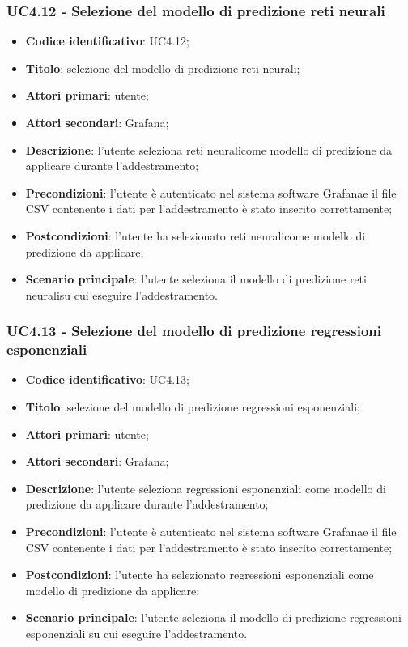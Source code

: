 \subsubsection{UC4.12 - Selezione del modello di predizione reti neurali}
\begin{itemize}
	\item \textbf{Codice identificativo}: UC4.12;
	\item \textbf{Titolo}: selezione del modello di predizione reti neurali\glo;
	\item \textbf{Attori primari}: utente;
	\item \textbf{Attori secondari}: Grafana\glo;
	\item \textbf{Descrizione}: l'utente seleziona reti neurali\glosp come modello di predizione da applicare durante l'addestramento;
	\item \textbf{Precondizioni}: l'utente è autenticato nel sistema software Grafana\glosp e il file CSV contenente i dati per l'addestramento è stato inserito correttamente;
	\item \textbf{Postcondizioni}: l'utente ha selezionato reti neurali\glosp come modello di predizione da applicare;
	\item \textbf{Scenario principale}: l'utente seleziona il modello di predizione reti neurali\glosp su cui eseguire l'addestramento.
\end{itemize}
\subsubsection{UC4.13 - Selezione del modello di predizione regressioni esponenziali}
\begin{itemize}
	\item \textbf{Codice identificativo}: UC4.13;
	\item \textbf{Titolo}: selezione del modello di predizione regressioni esponenziali;
	\item \textbf{Attori primari}: utente;
	\item \textbf{Attori secondari}: Grafana\glo;
	\item \textbf{Descrizione}: l'utente seleziona regressioni esponenziali come modello di predizione da applicare durante l'addestramento;
	\item \textbf{Precondizioni}: l'utente è autenticato nel sistema software Grafana\glosp e il file CSV contenente i dati per l'addestramento è stato inserito correttamente;
	\item \textbf{Postcondizioni}: l'utente ha selezionato regressioni esponenziali come modello di predizione da applicare;
	\item \textbf{Scenario principale}: l'utente seleziona il modello di predizione regressioni esponenziali su cui eseguire l'addestramento.
\end{itemize}
